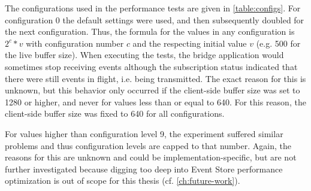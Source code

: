 The configurations used in the performance tests are given in \cref{table:configs}.
For configuration 0 the default settings were used, and then subsequently doubled for the next configuration.
Thus, the formula for the values in any configuration is $ 2^c * v $ with configuration number $c$ and the respecting initial value $v$ (e.g. 500 for the live buffer size).
When executing the tests, the bridge application would sometimes stop receiving events although the subscription status indicated that there were still events in flight, i.e. being transmitted.
The exact reason for this is unknown, but this behavior only occurred if the client-side buffer size was set to 1280 or higher, and never for values less than or equal to 640.
For this reason, the client-side buffer size was fixed to 640 for all configurations.

For values higher than configuration level 9, the experiment suffered similar problems and thus configuration levels are capped to that number.
Again, the reasons for this are unknown and could be implementation-specific, but are not further investigated because digging too deep into Event Store performance optimization is out of scope for this thesis (cf. \cref{ch:future-work}).


